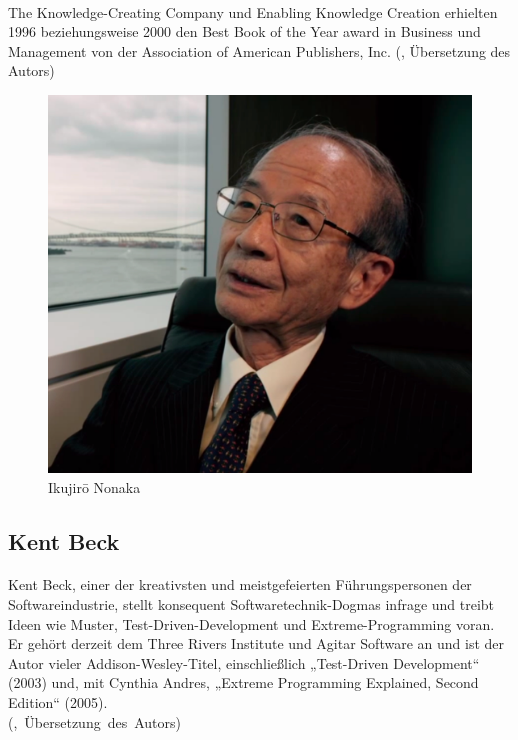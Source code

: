 \documentclass{article}
\begin{document}
\paragraph{}
\glqq The Knowledge-Creating Company\grqq{} und \glqq Enabling Knowledge Creation\grqq{} erhielten 1996 beziehungsweise 2000 den \glqq Best Book of the Year\grqq{} award in Business und Management von der Association of American Publishers, Inc. (\cite{ikuji}, Übersetzung des Autors)

\begin{figure}[h]
  \centering
  \includegraphics[scale=.7]{img/ikuji.png}
  \caption{Ikujirō Nonaka}
  \label{ikujipng}
\end{figure}

\pagebreak

\subsection{Kent Beck}
\paragraph{}
Kent Beck, einer der kreativsten und meistgefeierten Führungspersonen der Softwareindustrie, stellt konsequent Softwaretechnik-Dogmas infrage und treibt Ideen wie Muster, Test-Driven-Development und Extreme-Programming voran. Er gehört derzeit dem Three Rivers Institute und Agitar Software an und ist der Autor vieler Addison-Wesley-Titel, einschließlich „Test-Driven Development“ (2003) und, mit Cynthia Andres, „Extreme Programming Explained, Second Edition“ (2005). \\
(\cite[Buchrückseite]{beck2},~Übersetzung~des~Autors)
\end{document}
